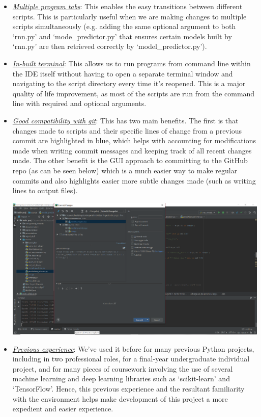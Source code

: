 \documentclass[12pt,twoside]{report}
\begin{document}
\begin{itemize}
	\item \underline{\textit{Multiple program tabs}}: This enables the easy transitions between different scripts. This is particularly useful when we are making changes to multiple scripts simultaneously (e.g. adding the same optional argument to both ‘rnn.py’ and ‘mode\_predictor.py’ that ensures certain models built by ‘rnn.py’ are then retrieved correctly by ‘model\_predictor.py’).
	\item \underline{\textit{In-built terminal}}: This allows us to run programs from command line within the IDE itself without having to open a separate terminal window and navigating to the script directory every time it’s reopened. This is a major quality of life improvement, as most of the scripts are run from the command line with required and optional arguments.
	\item \underline{\textit{Good compatibility with git}}: This has two main benefits. The first is that changes made to scripts and their specific lines of change from a previous commit are highlighted in blue, which helps with accounting for modifications made when writing commit messages and keeping track of all recent changes made. The other  benefit is the GUI approach to committing to the GitHub repo (as can be seen below) which is a much easier way to make regular commits and also highlights easier more subtle changes made (such as writing lines to output files).
\begin{center}
\includegraphics[scale=1]{project_figures/fig4_3}
\end{center}
	\item \underline{\textit{Previous experience}}: We’ve used it before for many previous Python projects, including in two professional roles, for a final-year undergraduate individual project, and for many pieces of coursework involving the use of several machine learning and deep learning libraries such as ‘scikit-learn’ and ‘TensorFlow’. Hence, this previous experience and the resultant familiarity with the environment helps make development of this project a more expedient and easier experience.

\end{itemize}
\end{document}
